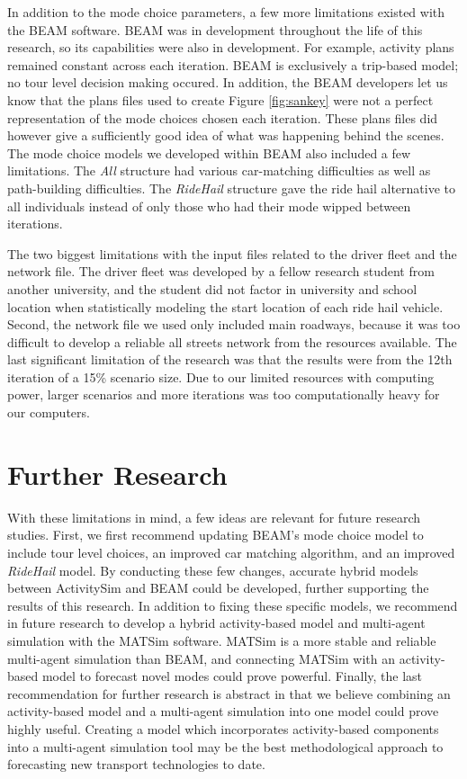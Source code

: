 \documentclass[fancy, masters]{byuthesis}
\begin{document}
In addition to the mode choice parameters, a few more limitations existed with the BEAM software. BEAM was in development throughout the life of this research, so its capabilities were also in development. For example, activity plans remained constant across each iteration. BEAM is exclusively a trip-based model; no tour level decision making occured. In addition, the BEAM developers let us know that the plans files used to create Figure \ref{fig:sankey} were not a perfect representation of the mode choices chosen each iteration. These plans files did however give a sufficiently good idea of what was happening behind the scenes. The mode choice models we developed within BEAM also included a few limitations. The \emph{All} structure had various car-matching difficulties as well as path-building difficulties. The \emph{RideHail} structure gave the ride hail alternative to all individuals instead of only those who had their mode wipped between iterations.

The two biggest limitations with the input files related to the driver fleet and the network file. The driver fleet was developed by a fellow research student from another university, and the student did not factor in university and school location when statistically modeling the start location of each ride hail vehicle. Second, the network file we used only included main roadways, because it was too difficult to develop a reliable all streets network from the resources available. The last significant limitation of the research was that the results were from the 12th iteration of a 15\% scenario size. Due to our limited resources with computing power, larger scenarios and more iterations was too computationally heavy for our computers.

\hypertarget{further-research}{%
\section{Further Research}\label{further-research}}

With these limitations in mind, a few ideas are relevant for future research studies. First, we first recommend updating BEAM's mode choice model to include tour level choices, an improved car matching algorithm, and an improved \emph{RideHail} model. By conducting these few changes, accurate hybrid models between ActivitySim and BEAM could be developed, further supporting the results of this research. In addition to fixing these specific models, we recommend in future research to develop a hybrid activity-based model and multi-agent simulation with the MATSim software. MATSim is a more stable and reliable multi-agent simulation than BEAM, and connecting MATSim with an activity-based model to forecast novel modes could prove powerful. Finally, the last recommendation for further research is abstract in that we believe combining an activity-based model and a multi-agent simulation into one model could prove highly useful. Creating a model which incorporates activity-based components into a multi-agent simulation tool may be the best methodological approach to forecasting new transport technologies to date.
\end{document}
